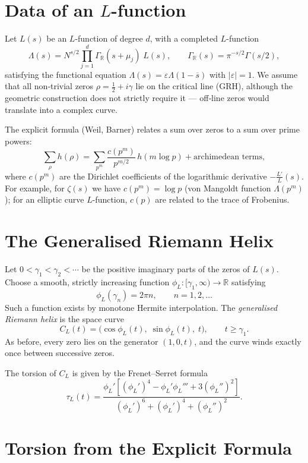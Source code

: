 \documentclass[12pt,a4paper]{article}
\begin{document}
\section{Data of an \(L\)-function}

Let \(L(s)\) be an \(L\)-function of degree \(d\), with a completed \(L\)-function
\[
\Lambda(s) = N^{s/2} \prod_{j=1}^d \Gamma_{\mathbb{R}}(s+\mu_j) \; L(s),
\qquad \Gamma_{\mathbb{R}}(s) = \pi^{-s/2}\Gamma(s/2),
\]
satisfying the functional equation \(\Lambda(s) = \varepsilon \Lambda(1-\overline{s})\) with \(|\varepsilon|=1\). We assume that all non‑trivial zeros \(\rho = \tfrac12 + i\gamma\) lie on the critical line (GRH), although the geometric construction does not strictly require it --- off‑line zeros would translate into a complex curve.

The explicit formula (Weil, Barner) relates a sum over zeros to a sum over prime powers:
\[
\sum_{\rho} h(\rho) = \sum_{p^m} \frac{c(p^m)}{p^{m/2}}\,h(m\log p) + \text{archimedean terms},
\tag{1}
\]
where \(c(p^m)\) are the Dirichlet coefficients of the logarithmic derivative \(-\frac{L'}{L}(s)\). For example, for \(\zeta(s)\) we have \(c(p^m) = \log p\) (von Mangoldt function \(\Lambda(p^m)\)); for an elliptic curve \(L\)-function, \(c(p)\) are related to the trace of Frobenius.

\section{The Generalised Riemann Helix}

Let \(0 < \gamma_1 < \gamma_2 < \cdots\) be the positive imaginary parts of the zeros of \(L(s)\). Choose a smooth, strictly increasing function \(\phi_L:[\gamma_1,\infty)\to\mathbb{R}\) satisfying
\[
\phi_L(\gamma_n) = 2\pi n,\qquad n=1,2,\dots
\]
Such a function exists by monotone Hermite interpolation. The \emph{generalised Riemann helix} is the space curve
\[
C_L(t) = \bigl(\cos\phi_L(t),\; \sin\phi_L(t),\; t\bigr),\qquad t\ge\gamma_1.
\]
As before, every zero lies on the generator \((1,0,t)\), and the curve winds exactly once between successive zeros.

The torsion of \(C_L\) is given by the Frenet--Serret formula
\[
\tau_L(t) = \frac{\phi_L'[(\phi_L')^4 - \phi_L'\phi_L''' + 3(\phi_L'')^2]}{(\phi_L')^6 + (\phi_L')^4 + (\phi_L'')^2}.
\tag{2}
\]

\section{Torsion from the Explicit Formula}
\end{document}
